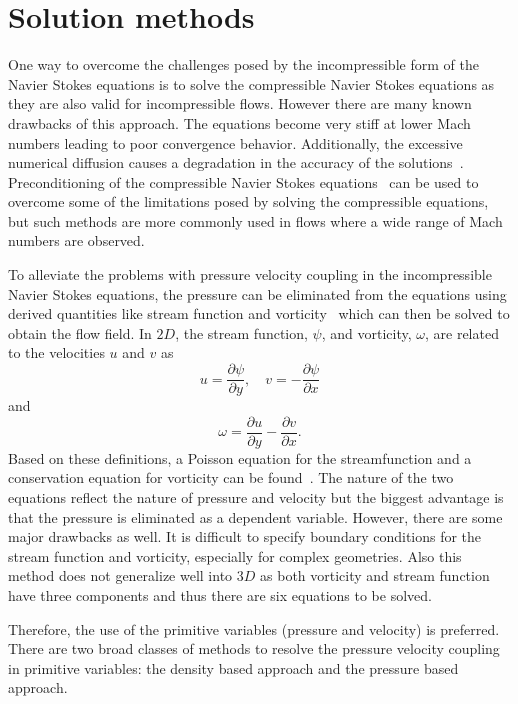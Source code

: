 \section{Solution methods}\label{ssec:pbdb}
One way to overcome the challenges posed by the incompressible form of the Navier Stokes equations is to solve the compressible Navier Stokes equations as they are also valid for incompressible flows. However there are many known drawbacks of this approach. The equations become very stiff at lower Mach numbers leading to poor convergence behavior. Additionally, the excessive numerical diffusion causes a degradation in the accuracy of the solutions~\cite{Tom2019,barsukow2017numerical}. Preconditioning of the compressible Navier Stokes equations~\cite{turkel1987preconditioned} can be used to overcome some of the limitations posed by solving the compressible equations, but such methods are more commonly used in flows where a wide range of Mach numbers are observed.

To alleviate the problems with pressure velocity coupling in the incompressible Navier Stokes equations, the pressure can be eliminated from the equations using derived quantities like stream function and vorticity~\cite{hirsch1997numerical, Ferziger2002} which can then be solved to obtain the flow field. In $2D$, the stream function, $\psi$, and vorticity, $\omega$, are related to the velocities $u$ and $v$ as
\begin{equation}
u = \frac{\partial \psi}{\partial y}, \quad v = -\frac{\partial \psi}{\partial x}
\end{equation}
and
\begin{equation}
\omega = \frac{\partial u}{\partial y} - \frac{\partial v}{\partial x}.
\end{equation}
Based on these definitions, a Poisson equation for the streamfunction and a conservation equation for vorticity can be found~\cite{Ferziger2002}. The nature of the two equations reflect the nature of pressure and velocity but the biggest advantage is that the pressure is eliminated as a dependent variable. However, there are some major drawbacks as well. It is difficult to specify boundary conditions for the stream function and vorticity, especially for complex geometries. Also this method does not generalize well into $3D$ as both vorticity and stream function have three components and thus there are six equations to be solved. 

Therefore, the use of the primitive variables (pressure and velocity) is preferred. There are two broad classes of methods to resolve the pressure velocity coupling in primitive variables: the density based approach and the pressure based approach.

